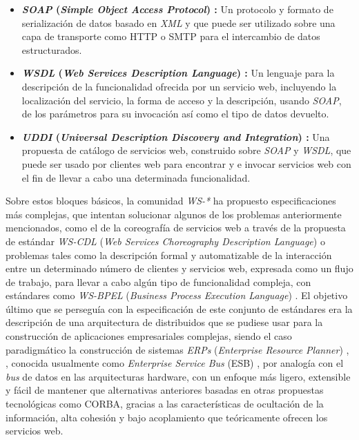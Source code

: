 \begin{itemize}
\item \textbf{\textit{SOAP} (\textit{Simple Object Access Protocol}) \cite{soap}:} Un protocolo y formato de serializaci\'on de datos basado en \textit{XML} y que puede ser utilizado sobre una capa de transporte como HTTP o SMTP para el intercambio de datos estructurados.

\item \textbf{\textit{WSDL} (\textit{Web Services Description Language}) \cite{wsdl}:} Un lenguaje para la descripci\'on de la funcionalidad ofrecida por un servicio web, incluyendo la localizaci\'on del servicio, la forma de acceso y la descripci\'on, usando \textit{SOAP}, de los par\'ametros para su invocaci\'on as\'i como el tipo de datos devuelto.

\item \textbf{\textit{UDDI} (\textit{Universal Description Discovery and Integration}) \cite{uddi}:} Una propuesta de cat\'alogo de servicios web, construido sobre \textit{SOAP} y \textit{WSDL}, que puede ser usado por clientes web para encontrar y e invocar servicios web con el fin de llevar a cabo una determinada funcionalidad.
\end{itemize}


Sobre estos bloques b\'asicos, la comunidad \textit{WS-*} ha propuesto especificaciones m\'as complejas, que intentan solucionar algunos de los problemas anteriormente mencionados, como el de la coreograf\'ia de servicios web a trav\'es de la propuesta de est\'andar \textit{WS-CDL} (\textit{Web Services Choreography Description Language}) \cite{wscdl} o problemas tales como la descripci\'on formal y automatizable de la interacci\'on entre un determinado n\'umero de clientes y servicios web, expresada como un flujo de trabajo, para llevar a cabo alg\'un tipo de funcionalidad compleja, con est\'andares como \textit{WS-BPEL} (\textit{Business Process Execution Language}) \cite{wsbpel}. El objetivo \'ultimo que se persegu\'ia con la especificaci\'on de este conjunto de est\'andares era la descripci\'on de una arquitectura de distribuidos que se pudiese usar para la construcci\'on de aplicaciones empresariales complejas, siendo el caso paradigm\'atico la construcci\'on de sistemas \textit{ERPs} (\textit{Enterprise Resource Planner}) \cite{jian2008design}, \cite{li2009research}, conocida usualmente como \textit{Enterprise Service Bus} (ESB) \cite{esb}, por analog\'ia con el \textit{bus} de datos en las arquitecturas hardware, con un enfoque m\'as ligero, extensible y f\'acil de mantener que alternativas anteriores basadas en otras propuestas tecnol\'ogicas como CORBA, gracias a las caracter\'isticas de ocultaci\'on de la informaci\'on, alta cohesi\'on y bajo acoplamiento que te\'oricamente ofrecen los servicios web.\\

